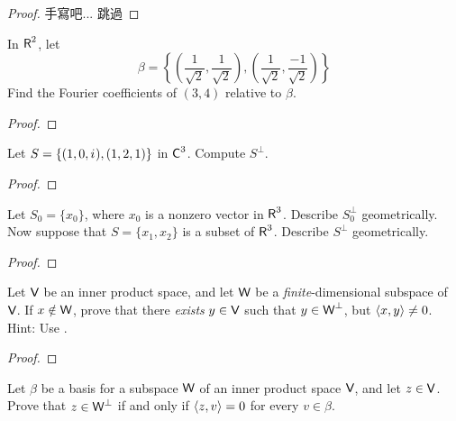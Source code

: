 \begin{proof}
手寫吧... 跳過
\end{proof}

\begin{exercise} \label{exercise 6.2.3}
In \(\textsf{R}^2\), let
\[
    \beta = \left\{
        \left( \frac{1}{\sqrt{2}}, \frac{1}{\sqrt{2}} \right), \left( \frac{1}{\sqrt{2}}, \frac{-1}{\sqrt{2}} \right)
    \right\}
\]
Find the Fourier coefficients of \((3, 4)\) relative to \(\beta\).
\end{exercise}

\begin{proof}
\end{proof}

\begin{exercise} \label{exercise 6.2.4}
Let \(S = \{ (1, 0, {i\mkern1mu}), (1, 2, 1) \}\) in \(\textsf{C}^3\). Compute \(S^{\perp}\).
\end{exercise}

\begin{proof}
\end{proof}

\begin{exercise} \label{exercise 6.2.5}
Let \(S_0 = \{ x_0 \}\), where \(x_0\) is a nonzero vector in \(\textsf{R}^3\).
Describe \(S_0^{\perp}\) geometrically.
Now suppose that \(S = \{ x_1, x_2 \}\) is a \LID{} subset of \(\textsf{R}^3\).
Describe \(S^{\perp}\) geometrically.
\end{exercise}

\begin{proof}
\end{proof}

\begin{exercise} \label{exercise 6.2.6}
Let \(\textsf{V}\) be an inner product space, and let \(\textsf{W}\) be a \emph{finite}-dimensional subspace of \(\textsf{V}\).
If \(x \notin \textsf{W}\), prove that there \emph{exists} \(y \in \textsf{V}\) such that \(y \in \textsf{W}^{\perp}\), but \(\left< x, y \right> \ne 0\).
Hint: Use .
\end{exercise}

\begin{proof}
\end{proof}

\begin{exercise} \label{exercise 6.2.7}
Let \(\beta\) be a basis for a subspace \(\textsf{W}\) of an inner product space \(\textsf{V}\), and let \(z \in \textsf{V}\).
Prove that \(z \in \textsf{W}^{\perp}\) if and only if \(\left< z, v \right> = 0\) for every \(v \in \beta\).
\end{exercise}

